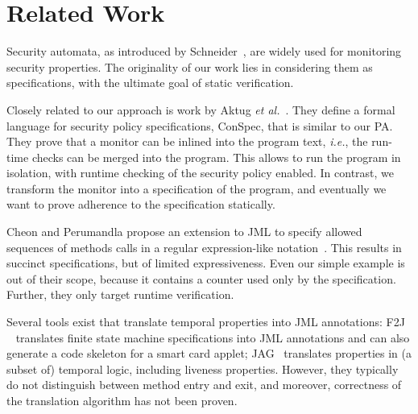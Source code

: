 \section{Related Work}\label{SecRelated}

Security automata, as introduced by Schneider~\cite{Schneider99}, are
widely used for monitoring security properties. The originality of our
work lies in considering them as specifications, with the ultimate
goal of static verification.

Closely related to our approach is work by Aktug \emph{et
al.}~\cite{Aktug07,AktugDG08}. They define a formal language for
security policy specifications, ConSpec, that is similar to our
PA. They prove that a monitor can be inlined into the program text,
\emph{i.e.}, the run-time checks can be merged into the program. This
allows to run the program in isolation, with runtime checking of the
security policy enabled. In contrast, we transform the monitor into a
specification of the program, and eventually we want to prove
adherence to the specification statically.

Cheon and Perumandla propose an extension to JML to specify allowed
sequences of methods calls in a regular expression-like
notation~\cite{Cheon07}.  This results in succinct specifications, but
of limited expressiveness. Even our simple example is out of their
scope, because it contains a counter used only by the
specification. Further, they only target runtime verification.

Several tools exist that translate temporal properties into JML
annotations: F2J ~\cite{Hubbers03} translates finite state machine
specifications into JML annotations and can also generate a code
skeleton for a smart card applet; JAG~\cite{Giorgetti06} translates
properties in (a subset of) temporal logic, including liveness
properties.  However, they typically do not distinguish between method
entry and exit, and moreover, correctness of the translation algorithm
has not been proven.

